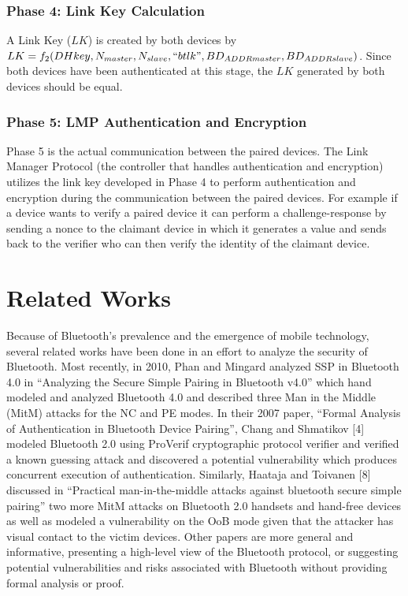 \documentclass{acm_proc_article-sp}
\begin{document}
\subsubsection{Phase 4: Link Key Calculation}
A Link Key ($LK$) is created by both devices by $LK = f_2(DHkey, N_{master}, N_{slave}, ``btlk", BD_{ADDRmaster}, BD_{ADDRslave} )$. Since both devices have been authenticated at this stage, the $LK$ generated by both devices should be equal.

\subsubsection{Phase 5: LMP Authentication and Encryption}
Phase 5 is the actual communication between the paired devices. The Link Manager Protocol (the controller that handles authentication and encryption) utilizes the link key developed in Phase 4 to perform authentication and encryption during the communication between the paired devices. For example if a device wants to verify a paired device it can perform a challenge-response by sending a nonce to the claimant device in which it generates a value and sends back to the verifier who can then verify the identity of the claimant device.

\section{Related Works}


Because of Bluetooth's prevalence and the emergence of mobile technology, several related works have been done in an effort to analyze the security of Bluetooth. Most recently, in 2010, Phan and Mingard \cite{phan:mingard} analyzed SSP in Bluetooth 4.0 in ``Analyzing the Secure Simple Pairing in Bluetooth v4.0'' which hand modeled and analyzed Bluetooth 4.0 and described three Man in the Middle (MitM) attacks for the NC and PE modes. In their 2007 paper, ``Formal Analysis of Authentication in Bluetooth Device Pairing'', Chang and Shmatikov [4] modeled Bluetooth 2.0 using ProVerif cryptographic protocol verifier and verified a known guessing attack and discovered a potential vulnerability which produces concurrent execution of authentication. Similarly, Haataja and Toivanen [8] discussed in ``Practical man-in-the-middle attacks against bluetooth secure simple pairing'' two more MitM attacks on Bluetooth 2.0 handsets and hand-free devices as well as modeled a vulnerability on the OoB mode given that the attacker has visual contact to the victim devices. Other papers are more general and informative, presenting a high-level view of the Bluetooth protocol, or suggesting potential vulnerabilities and risks associated with Bluetooth without providing formal analysis or proof.
\end{document}
